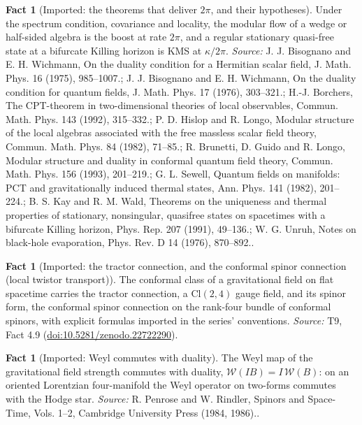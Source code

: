 \documentclass[11pt]{article}
\theoremstyle{definition}
\newtheorem{fact}[theorem]{Fact}
\theoremstyle{plain}
\providecommand{\Cl}{}\renewcommand{\Cl}{\mathrm{Cl}}
\begin{document}
\begin{fact}[Imported: the theorems that deliver $2\pi$, and their hypotheses]\label{c:angle.imported-theorems-deliver-their-hypotheses}
Under the spectrum condition, covariance and locality, the modular flow of a wedge or half-sided algebra is the boost at rate $2\pi$, and a regular stationary quasi-free state at a bifurcate Killing horizon is KMS at $\kappa/2\pi$.
\emph{Source:} J. J. Bisognano and E. H. Wichmann, On the duality condition for a Hermitian scalar field, J. Math. Phys. 16 (1975), 985--1007.; J. J. Bisognano and E. H. Wichmann, On the duality condition for quantum fields, J. Math. Phys. 17 (1976), 303--321.; H.-J. Borchers, The CPT-theorem in two-dimensional theories of local observables, Commun. Math. Phys. 143 (1992), 315--332.; P. D. Hislop and R. Longo, Modular structure of the local algebras associated with the free massless scalar field theory, Commun. Math. Phys. 84 (1982), 71--85.; R. Brunetti, D. Guido and R. Longo, Modular structure and duality in conformal quantum field theory, Commun. Math. Phys. 156 (1993), 201--219.; G. L. Sewell, Quantum fields on manifolds: PCT and gravitationally induced thermal states, Ann. Phys. 141 (1982), 201--224.; B. S. Kay and R. M. Wald, Theorems on the uniqueness and thermal properties of stationary, nonsingular, quasifree states on spacetimes with a bifurcate Killing horizon, Phys. Rep. 207 (1991), 49--136.; W. G. Unruh, Notes on black-hole evaporation, Phys. Rev. D 14 (1976), 870--892..
\end{fact}

\begin{fact}[Imported: the tractor connection, and the conformal spinor connection (local twistor transport)]\label{c:correspondence.imported-tractor-connection-local-twistor-transport}
The conformal class of a gravitational field on flat spacetime carries the tractor connection, a $\Cl(2,4)$ gauge field, and its spinor form, the conformal spinor connection on the rank-four bundle of conformal spinors, with explicit formulas imported in the series' conventions.
\emph{Source:} T9, Fact 4.9 (\href{https://doi.org/10.5281/zenodo.22722290}{doi:10.5281/zenodo.22722290}).
\end{fact}

\begin{fact}[Imported: Weyl commutes with duality]\label{c:correspondence.imported-weyl-commutes-duality}
The Weyl map of the gravitational field strength commutes with duality, $\mathcal{W}(IB) = I\,\mathcal{W}(B)$: on an oriented Lorentzian four-manifold the Weyl operator on two-forms commutes with the Hodge star.
\emph{Source:} R. Penrose and W. Rindler, Spinors and Space-Time, Vols. 1--2, Cambridge University Press (1984, 1986)..
\end{fact}
\end{document}

